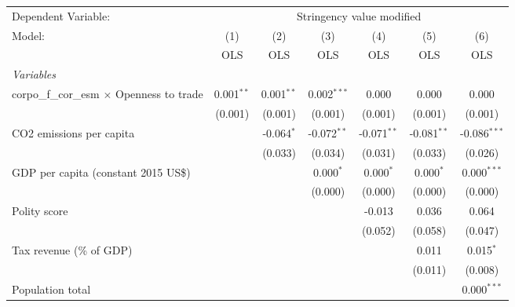 
\begingroup
\centering
\begin{tabular}{lcccccc}
   \toprule
   Dependent Variable: & \multicolumn{6}{c}{Stringency value modified}\\
   Model:                                            & (1)          & (2)          & (3)           & (4)           & (5)           & (6)\\  
                                                     &  OLS         & OLS          & OLS           & OLS           & OLS           & OLS\\  
   \midrule
   \emph{Variables}\\
   corpo\_f\_cor\_esm $\times$ Openness to trade     & 0.001$^{**}$ & 0.001$^{**}$ & 0.002$^{***}$ & 0.000         & 0.000         & 0.000\\   
                                                     & (0.001)      & (0.001)      & (0.001)       & (0.001)       & (0.001)       & (0.001)\\   
   CO2 emissions per capita                          &              & -0.064$^{*}$ & -0.072$^{**}$ & -0.071$^{**}$ & -0.081$^{**}$ & -0.086$^{***}$\\   
                                                     &              & (0.033)      & (0.034)       & (0.031)       & (0.033)       & (0.026)\\   
   GDP per capita (constant 2015 US\$)               &              &              & 0.000$^{*}$   & 0.000$^{*}$   & 0.000$^{*}$   & 0.000$^{***}$\\   
                                                     &              &              & (0.000)       & (0.000)       & (0.000)       & (0.000)\\   
   Polity score                                      &              &              &               & -0.013        & 0.036         & 0.064\\   
                                                     &              &              &               & (0.052)       & (0.058)       & (0.047)\\   
   Tax revenue (\% of GDP)                           &              &              &               &               & 0.011         & 0.015$^{*}$\\   
                                                     &              &              &               &               & (0.011)       & (0.008)\\   
   Population total                                  &              &              &               &               &               & 0.000$^{***}$\\   

\end{tabular}
